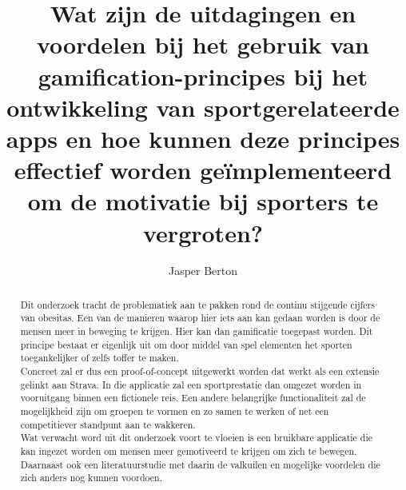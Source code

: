 \documentclass{hogent-article}
\title{Wat zijn de uitdagingen en voordelen bij het gebruik van gamification-principes bij het ontwikkeling van sportgerelateerde apps en hoe kunnen deze principes effectief worden geïmplementeerd om de motivatie bij sporters te vergroten?}
\author{Jasper Berton}
\begin{document}
\begin{abstract}
    
   Dit onderzoek tracht de problematiek aan te pakken rond de continu stijgende cijfers van obesitas. Een van de manieren waarop hier iets aan kan gedaan worden is door de mensen meer in beweging te krijgen. Hier kan dan gamificatie toegepast worden. Dit principe bestaat er eigenlijk uit om door middel van spel elementen het sporten toegankelijker of zelfs toffer te maken.
    \\
    
   Concreet zal er dus een proof-of-concept uitgewerkt worden dat werkt als een extensie gelinkt aan Strava. In die applicatie zal een sportprestatie dan omgezet worden in vooruitgang binnen een fictionele reis. Een andere belangrijke functionaliteit zal de mogelijkheid zijn om groepen te vormen en zo samen te werken of net een competitiever standpunt aan te wakkeren. \\
   
   Wat verwacht word uit dit onderzoek voort te vloeien is een bruikbare applicatie die kan ingezet worden om mensen meer gemotiveerd te krijgen om zich te bewegen. Daarnaast ook een literatuurstudie met daarin de valkuilen en mogelijke voordelen die zich anders nog kunnen voordoen. 
 
\end{abstract}

\tableofcontents



\printbibliography[heading=bibintoc]
\end{document}
